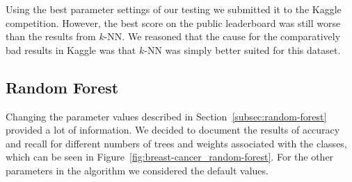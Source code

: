 \documentclass[a4paper,11pt]{article}
\begin{document}
        Using the best parameter settings of our testing we submitted it to the Kaggle competition. However, the best score on the public leaderboard was still worse than the results from $k$-NN. We reasoned that the cause for the comparatively bad results in Kaggle was that $k$-NN was simply better suited for this dataset. 
        
        
    
    \subsection{Random Forest}
        Changing the parameter values described in Section~\ref{subsec:random-forest} provided a lot of information. We decided to document the results of accuracy and recall for different numbers of trees and weights associated with the classes, which can be seen in Figure~\ref{fig:breast-cancer_random-forest}. For the other parameters in the algorithm we considered the default values. 
        
\end{document}

